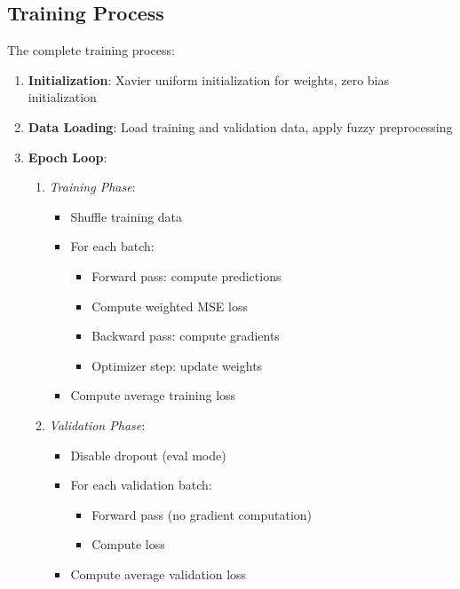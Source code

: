 \documentclass[12pt,a4paper]{report}
\begin{document}
\subsection{Training Process}

The complete training process:

\begin{enumerate}
    \item \textbf{Initialization}: Xavier uniform initialization for weights, zero bias initialization
    
    \item \textbf{Data Loading}: Load training and validation data, apply fuzzy preprocessing
    
    \item \textbf{Epoch Loop}:
    \begin{enumerate}
        \item \textit{Training Phase}:
        \begin{itemize}
            \item Shuffle training data
            \item For each batch:
            \begin{itemize}
                \item Forward pass: compute predictions
                \item Compute weighted MSE loss
                \item Backward pass: compute gradients
                \item Optimizer step: update weights
            \end{itemize}
            \item Compute average training loss
        \end{itemize}
        
        \item \textit{Validation Phase}:
        \begin{itemize}
            \item Disable dropout (eval mode)
            \item For each validation batch:
            \begin{itemize}
                \item Forward pass (no gradient computation)
                \item Compute loss
            \end{itemize}
            \item Compute average validation loss
        \end{itemize}
        

\end{enumerate}
\end{enumerate}
\end{document}

